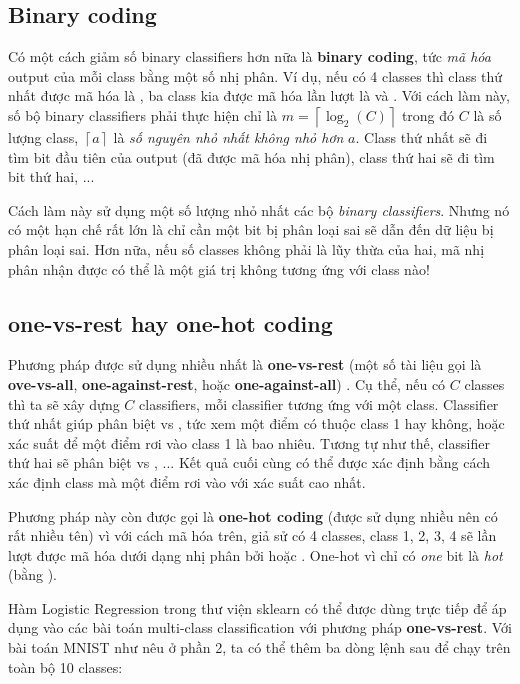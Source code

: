  
\subsection{Binary coding}
Có một cách giảm số binary classifiers hơn nữa là \textbf{binary coding}, tức \textit{mã hóa} output của mỗi class bằng một số nhị phân. Ví dụ, nếu có 4 classes thì class thứ nhất được mã hóa là , ba class kia được mã hóa lần lượt là  và . Với cách làm này, số bộ binary classifiers phải thực hiện chỉ là $m = \left\lceil\log_2(C)\right\rceil$ trong đó $C$ là số lượng class, $\left\lceil a \right\rceil$ là \textit{số nguyên nhỏ nhất không nhỏ hơn} $a$. Class thứ nhất sẽ đi tìm bit đầu tiên của output (đã được mã hóa nhị phân), class thứ hai sẽ đi tìm bit thứ hai, ... 
 
Cách làm này sử dụng một số lượng nhỏ nhất các bộ \textit{binary classifiers}. Nhưng nó có một hạn chế rất lớn là chỉ cần một bit bị phân loại sai sẽ dẫn đến dữ liệu bị phân loại sai. Hơn nữa, nếu số classes không phải là lũy thừa của hai, mã nhị phân nhận được có thể là một giá trị không tương ứng với class nào! 
 
 
\subsection{one-vs-rest hay one-hot coding}
Phương pháp được sử dụng nhiều nhất là \textbf{one-vs-rest} (một số tài liệu gọi là \textbf{ove-vs-all}, \textbf{one-against-rest}, hoặc \textbf{one-against-all}) . Cụ thể, nếu có $C$ classes thì ta sẽ xây dựng $C$ classifiers, mỗi classifier tương ứng với một class. Classifier thứ nhất giúp phân biệt  vs , tức xem một điểm có thuộc class 1 hay không, hoặc xác suất để một điểm rơi vào class 1 là bao nhiêu. Tương tự như thế, classifier thứ hai sẽ phân biệt  vs , ... Kết quả cuối cùng có thể được xác định bằng cách xác định class mà một điểm rơi vào với xác suất cao nhất.  
 
Phương pháp này còn được gọi là \textbf{one-hot coding} (được sử dụng nhiều nên có rất nhiều tên) vì với cách mã hóa trên, giả sử có 4 classes, class 1, 2, 3, 4 sẽ lần lượt được mã hóa dưới dạng nhị phân bởi  hoặc . One-hot vì chỉ có \textit{one} bit là \textit{hot} (bằng ).  
 
Hàm Logistic Regression trong thư viện sklearn có thể được dùng trực tiếp để áp dụng vào các bài toán multi-class classification với phương pháp \textbf{one-vs-rest}. Với bài toán MNIST như nêu ở phần 2, ta có thể thêm ba dòng lệnh sau để chạy trên toàn bộ 10 classes: 
 
